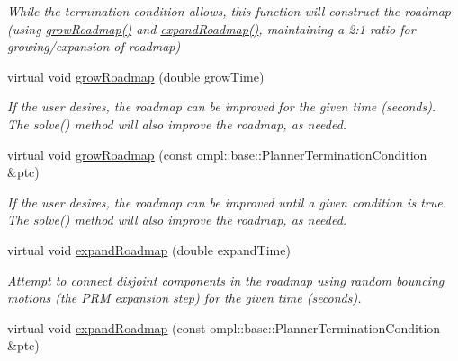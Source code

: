 \begin{DoxyCompactItemize}
\begin{DoxyCompactList}\small\item\em \-While the termination condition allows, this function will construct the roadmap (using \hyperlink{class_f_i_r_m_a947186c6e6be0b513efe0e0b476fef88}{grow\-Roadmap()} and \hyperlink{class_f_i_r_m_ad9cd5472a8bd1b1fcb83763128f7fd75}{expand\-Roadmap()}, maintaining a 2\-:1 ratio for growing/expansion of roadmap) \end{DoxyCompactList}\item 
\hypertarget{class_f_i_r_m_a947186c6e6be0b513efe0e0b476fef88}{virtual void \hyperlink{class_f_i_r_m_a947186c6e6be0b513efe0e0b476fef88}{grow\-Roadmap} (double grow\-Time)}\label{class_f_i_r_m_a947186c6e6be0b513efe0e0b476fef88}

\begin{DoxyCompactList}\small\item\em \-If the user desires, the roadmap can be improved for the given time (seconds). \-The solve() method will also improve the roadmap, as needed. \end{DoxyCompactList}\item 
\hypertarget{class_f_i_r_m_ae8e741b0af39a64d34dcfa4f29c0e509}{virtual void \hyperlink{class_f_i_r_m_ae8e741b0af39a64d34dcfa4f29c0e509}{grow\-Roadmap} (const ompl\-::base\-::\-Planner\-Termination\-Condition \&ptc)}\label{class_f_i_r_m_ae8e741b0af39a64d34dcfa4f29c0e509}

\begin{DoxyCompactList}\small\item\em \-If the user desires, the roadmap can be improved until a given condition is true. \-The solve() method will also improve the roadmap, as needed. \end{DoxyCompactList}\item 
\hypertarget{class_f_i_r_m_ad9cd5472a8bd1b1fcb83763128f7fd75}{virtual void \hyperlink{class_f_i_r_m_ad9cd5472a8bd1b1fcb83763128f7fd75}{expand\-Roadmap} (double expand\-Time)}\label{class_f_i_r_m_ad9cd5472a8bd1b1fcb83763128f7fd75}

\begin{DoxyCompactList}\small\item\em \-Attempt to connect disjoint components in the roadmap using random bouncing motions (the \-P\-R\-M expansion step) for the given time (seconds). \end{DoxyCompactList}\item 
\hypertarget{class_f_i_r_m_aac520fbbb43b0e3100498aa29117f0b9}{virtual void \hyperlink{class_f_i_r_m_aac520fbbb43b0e3100498aa29117f0b9}{expand\-Roadmap} (const ompl\-::base\-::\-Planner\-Termination\-Condition \&ptc)}\label{class_f_i_r_m_aac520fbbb43b0e3100498aa29117f0b9}


\end{DoxyCompactItemize}
